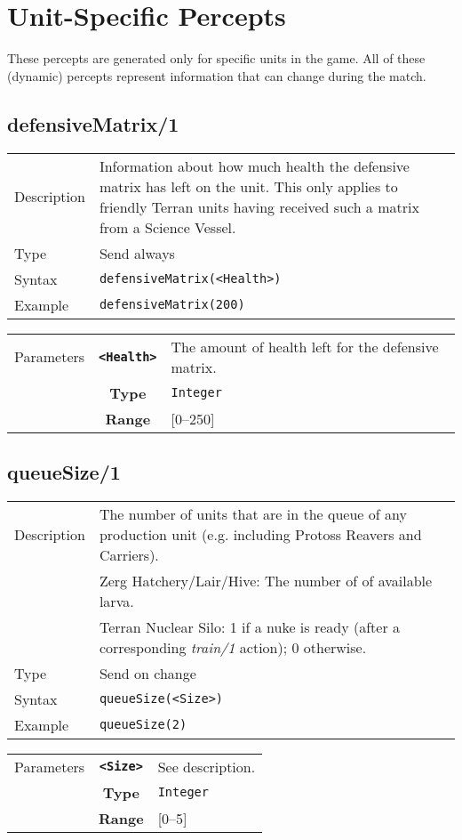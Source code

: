 \newpage

\section{Unit-Specific Percepts}
These percepts are generated only for specific units in the game. All of these (dynamic) percepts represent information that can change during the match.

\subsection{defensiveMatrix/1}
\begin{tabularx}{\textwidth}{lX}
 Description & Information about how much health the defensive matrix has left on the unit. This only applies to friendly Terran units having received such a matrix from a Science Vessel. \\
 Type & Send always \\
 Syntax & \verb|defensiveMatrix(<Health>)| \\
 Example & \verb|defensiveMatrix(200)|   \\
 \end{tabularx}
 \begin{tabularx}{\textwidth}{l | c | p{8cm}|}
 \cline{2-3}
 Parameters & \textbf{\verb|<Health>|} & The amount of health left for the defensive matrix.\\
            & \textbf{Type} & \verb|Integer| \\
            & \textbf{Range} & [0--250] \\
            \cline{2-3}
\end{tabularx}

\subsection{queueSize/1}
\begin{tabularx}{\textwidth}{lX}
 Description & The number of units that are in the queue of any production unit (e.g. including Protoss Reavers and Carriers).\\
 & Zerg Hatchery/Lair/Hive: The number of of available larva.\\
 & Terran Nuclear Silo: 1 if a nuke is ready (after a corresponding \textit{train/1} action); 0 otherwise.\\
 Type & Send on change \\
 Syntax & \verb|queueSize(<Size>)| \\
 Example & \verb|queueSize(2)| \\
 \end{tabularx}
 \begin{tabularx}{\textwidth}{l | c | p{8cm}|}
 \cline{2-3}
 Parameters & \textbf{\verb|<Size>|} & See description. \\
            & \textbf{Type} & \verb|Integer| \\
            & \textbf{Range} & [0--5] \\
            \cline{2-3}
\end{tabularx}

